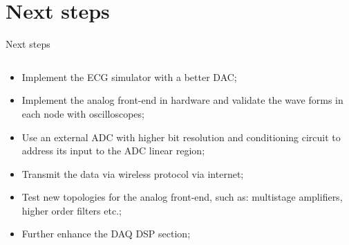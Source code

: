 \section{Next steps}

\begin{frame}{Next steps}
\begin{column}{\textwidth}
        \begin{itemize}
            \item Implement the ECG simulator with a better DAC;
            \item Implement the analog front-end in hardware and validate the wave forms in each node with oscilloscopes;
            \item Use an external ADC with higher bit resolution and conditioning circuit to address its input to the ADC linear region;
            \item Transmit the data via wireless protocol via internet;
            \item Test new topologies for the analog front-end, such as: multistage amplifiers, higher order filters etc.;
            \item Further enhance the DAQ DSP section;
        \end{itemize}
\end{column}{\textwidth}
\end{frame}

